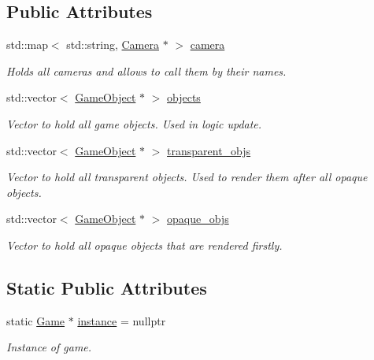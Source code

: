 \subsection*{Public Attributes}
\begin{DoxyCompactItemize}
\item 
std\+::map$<$ std\+::string, \mbox{\hyperlink{class_camera}{Camera}} $\ast$ $>$ \mbox{\hyperlink{class_game_af4eb1b9c217dcb0f860ec9b0320f2274}{camera}}
\begin{DoxyCompactList}\small\item\em Holds all cameras and allows to call them by their names. \end{DoxyCompactList}\item 
std\+::vector$<$ \mbox{\hyperlink{class_game_object}{Game\+Object}} $\ast$ $>$ \mbox{\hyperlink{class_game_ac025aa21d226a5beb9ba19bc418af894}{objects}}
\begin{DoxyCompactList}\small\item\em Vector to hold all game objects. Used in logic update. \end{DoxyCompactList}\item 
std\+::vector$<$ \mbox{\hyperlink{class_game_object}{Game\+Object}} $\ast$ $>$ \mbox{\hyperlink{class_game_a29149a40296ca49ec4aacdad04716fe4}{transparent\+\_\+objs}}
\begin{DoxyCompactList}\small\item\em Vector to hold all transparent objects. Used to render them after all opaque objects. \end{DoxyCompactList}\item 
std\+::vector$<$ \mbox{\hyperlink{class_game_object}{Game\+Object}} $\ast$ $>$ \mbox{\hyperlink{class_game_affc1bb149ae6c474261ba1bfe133af07}{opaque\+\_\+objs}}
\begin{DoxyCompactList}\small\item\em Vector to hold all opaque objects that are rendered firstly. \end{DoxyCompactList}\end{DoxyCompactItemize}
\subsection*{Static Public Attributes}
\begin{DoxyCompactItemize}
\item 
static \mbox{\hyperlink{class_game}{Game}} $\ast$ \mbox{\hyperlink{class_game_aa469cdc0a30f4fd2d6d99b23f4fbf257}{instance}} = nullptr
\begin{DoxyCompactList}\small\item\em Instance of game. \end{DoxyCompactList}\end{DoxyCompactItemize}

